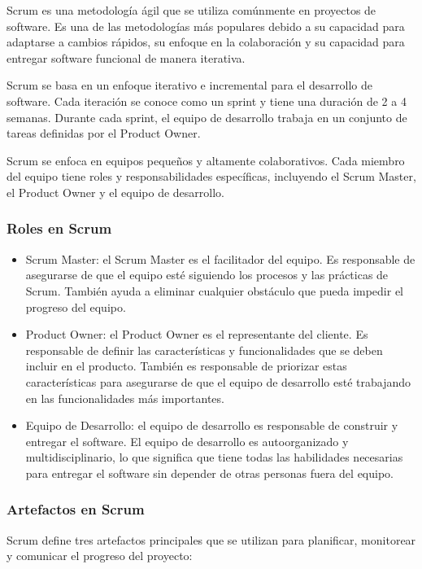 \documentclass[executivepaper]{article}
\begin{document}
Scrum es una metodología ágil que se utiliza comúnmente en proyectos de software. Es una de las metodologías más populares debido a su capacidad para adaptarse a cambios rápidos, su enfoque en la colaboración y su capacidad para entregar software funcional de manera iterativa.

Scrum se basa en un enfoque iterativo e incremental para el desarrollo de software. Cada iteración se conoce como un sprint y tiene una duración de 2 a 4 semanas. Durante cada sprint, el equipo de desarrollo trabaja en un conjunto de tareas definidas por el Product Owner.

Scrum se enfoca en equipos pequeños y altamente colaborativos. Cada miembro del equipo tiene roles y responsabilidades específicas, incluyendo el Scrum Master, el Product Owner y el equipo de desarrollo.

\subsubsection*{Roles en Scrum}

\begin{itemize}
\item Scrum Master: el Scrum Master es el facilitador del equipo. Es responsable de asegurarse de que el equipo esté siguiendo los procesos y las prácticas de Scrum. También ayuda a eliminar cualquier obstáculo que pueda impedir el progreso del equipo.
\item Product Owner: el Product Owner es el representante del cliente. Es responsable de definir las características y funcionalidades que se deben incluir en el producto. También es responsable de priorizar estas características para asegurarse de que el equipo de desarrollo esté trabajando en las funcionalidades más importantes.
\item Equipo de Desarrollo: el equipo de desarrollo es responsable de construir y entregar el software. El equipo de desarrollo es autoorganizado y multidisciplinario, lo que significa que tiene todas las habilidades necesarias para entregar el software sin depender de otras personas fuera del equipo.
\end{itemize}

\subsubsection*{Artefactos en Scrum}

Scrum define tres artefactos principales que se utilizan para planificar, monitorear y comunicar el progreso del proyecto:
\end{document}
